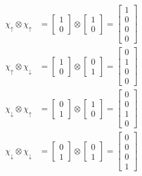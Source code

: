 \documentclass[12pt]{report}
\theoremstyle{custom}
\begin{document}
\begin{align*}
\chi_{\uparrow} \otimes \chi_{\uparrow} &= \begin{bmatrix}
    1 \\ 0
  \end{bmatrix} \otimes \begin{bmatrix}
    1 \\ 0
  \end{bmatrix} = \begin{bmatrix}
    1 \\ 0 \\ 0 \\ 0
  \end{bmatrix} \\
\chi_{\uparrow} \otimes \chi_{\downarrow} &= \begin{bmatrix}
    1 \\ 0
  \end{bmatrix} \otimes \begin{bmatrix}
    0 \\ 1
  \end{bmatrix} = \begin{bmatrix}
    0 \\ 1 \\ 0 \\ 0
  \end{bmatrix} \\
\chi_{\downarrow} \otimes \chi_{\uparrow} &= \begin{bmatrix}
    0 \\ 1
  \end{bmatrix} \otimes \begin{bmatrix}
    1 \\ 0
  \end{bmatrix} = \begin{bmatrix}
    0 \\ 0 \\ 1 \\ 0
  \end{bmatrix} \\
  \chi_{\downarrow} \otimes \chi_{\downarrow} &= \begin{bmatrix}
    0 \\ 1
  \end{bmatrix} \otimes \begin{bmatrix}
    0 \\ 1
  \end{bmatrix} = \begin{bmatrix}
    0 \\ 0 \\ 0 \\ 1
  \end{bmatrix}
\end{align*}
\end{document}
